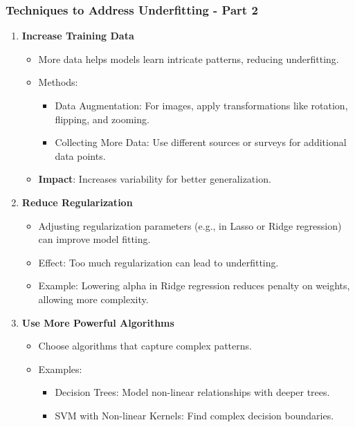 \documentclass[aspectratio=169]{beamer}
\begin{document}
\begin{frame}[fragile]
    \frametitle{Techniques to Address Underfitting - Part 2}
    \begin{enumerate}[resume]
        \item \textbf{Increase Training Data}
            \begin{itemize}
                \item More data helps models learn intricate patterns, reducing underfitting.
                \item Methods:
                    \begin{itemize}
                        \item Data Augmentation: For images, apply transformations like rotation, flipping, and zooming.
                        \item Collecting More Data: Use different sources or surveys for additional data points.
                    \end{itemize}
                \item \textbf{Impact}: Increases variability for better generalization.
            \end{itemize}
        
        \item \textbf{Reduce Regularization}
            \begin{itemize}
                \item Adjusting regularization parameters (e.g., in Lasso or Ridge regression) can improve model fitting.
                \item Effect: Too much regularization can lead to underfitting.
                \item Example: Lowering alpha in Ridge regression reduces penalty on weights, allowing more complexity.
            \end{itemize}
    
        \item \textbf{Use More Powerful Algorithms}
            \begin{itemize}
                \item Choose algorithms that capture complex patterns.
                \item Examples:
                    \begin{itemize}
                        \item Decision Trees: Model non-linear relationships with deeper trees.
                        \item SVM with Non-linear Kernels: Find complex decision boundaries.
                    \end{itemize}
            \end{itemize}
    \end{enumerate}
\end{frame}
\end{document}
